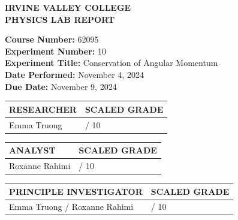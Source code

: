 \documentclass[12pt]{article}
\begin{document}
\begin{center}
    \textbf{\Large IRVINE VALLEY COLLEGE} \\
    \vspace{0.2cm}
    \textbf{\Large PHYSICS LAB REPORT}
\end{center}

\vspace{1cm}

\begin{flushleft}
    \textbf{Course Number:} 62095 \\
    \textbf{Experiment Number:} 10 \\
    \textbf{Experiment Title:} Conservation of Angular Momentum \\
    \textbf{Date Performed:} November 4, 2024 \\
    \textbf{Due Date:} November 9, 2024
\end{flushleft}

\vspace{1cm}
\begin{center}
    \begin{tabular}{|>{\centering\arraybackslash}m{5cm}|>{\centering\arraybackslash}m{5cm}|}
        \hline
        \textbf{RESEARCHER} & \textbf{SCALED GRADE} \\
        \hline
        Emma Truong & \underline{\hspace{2cm}} / 10 \\
        \hline
    \end{tabular}

    \vspace{1cm}

    \begin{tabular}{|>{\centering\arraybackslash}m{5cm}|>{\centering\arraybackslash}m{5cm}|}
        \hline
        \textbf{ANALYST} & \textbf{SCALED GRADE} \\
        \hline
        Roxanne Rahimi & \underline{\hspace{2cm}} / 10 \\
        \hline
    \end{tabular}

    \vspace{1cm}

    \begin{tabular}{|>{\centering\arraybackslash}m{5cm}|>{\centering\arraybackslash}m{5cm}|}
        \hline
        \textbf{PRINCIPLE INVESTIGATOR} & \textbf{SCALED GRADE} \\
        \hline
        Emma Truong / Roxanne Rahimi & \underline{\hspace{2cm}} / 10 \\
        \hline
    \end{tabular}
\end{center}
\end{document}
